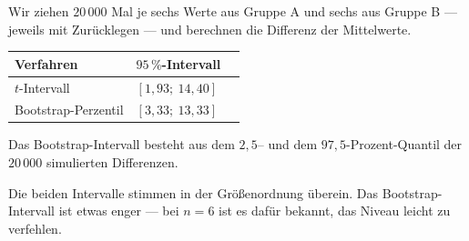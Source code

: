 \begin{merksatz}
Wir ziehen $20\,000$ Mal je sechs Werte aus Gruppe A und sechs aus Gruppe B --- jeweils mit Zurücklegen --- und berechnen die Differenz der Mittelwerte.

\begin{center}
\renewcommand{\arraystretch}{1.48}
\begin{tabular}{@{}P{3.2cm}P{2.6cm}P{2.2cm}@{}}
\toprule
\textbf{Verfahren} & \textbf{$95\,\%$-Intervall} & \\
\midrule
$t$-Intervall & $[1{,}93;\ 14{,}40]$ & \\
Bootstrap-Perzentil & $[3{,}33;\ 13{,}33]$ & \\
\bottomrule
\end{tabular}
\end{center}

Das Bootstrap-Intervall besteht aus dem $2{,}5$-- und dem $97{,}5$-Prozent-Quantil der $20\,000$ simulierten Differenzen.

Die beiden Intervalle stimmen in der Größenordnung überein. Das Bootstrap-Intervall ist etwas enger --- bei $n=6$ ist es dafür bekannt, das Niveau leicht zu verfehlen.

\begin{center}
\begin{minipage}{0.88\textwidth}
\end{minipage}
\end{center}
\end{merksatz}

